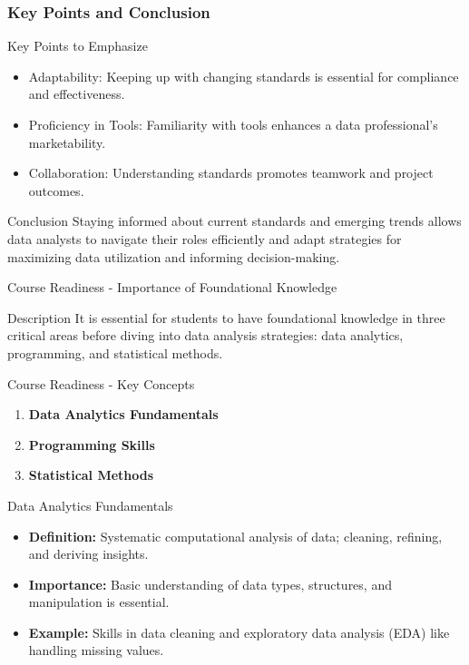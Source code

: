 \documentclass[aspectratio=169]{beamer}
\begin{document}
\begin{frame}[fragile]
    \frametitle{Key Points and Conclusion}
    \begin{block}{Key Points to Emphasize}
        \begin{itemize}
            \item Adaptability: Keeping up with changing standards is essential for compliance and effectiveness.
            \item Proficiency in Tools: Familiarity with tools enhances a data professional's marketability.
            \item Collaboration: Understanding standards promotes teamwork and project outcomes.
        \end{itemize}
    \end{block}

    \begin{block}{Conclusion}
        Staying informed about current standards and emerging trends allows data analysts to navigate their roles efficiently and adapt strategies for maximizing data utilization and informing decision-making.
    \end{block}
\end{frame}

\begin{frame}[fragile]{Course Readiness - Importance of Foundational Knowledge}
    \begin{block}{Description}
        It is essential for students to have foundational knowledge in three critical areas before diving into data analysis strategies: 
        data analytics, programming, and statistical methods.
    \end{block}
\end{frame}

\begin{frame}[fragile]{Course Readiness - Key Concepts}
    \begin{enumerate}
        \item \textbf{Data Analytics Fundamentals}
        \item \textbf{Programming Skills}
        \item \textbf{Statistical Methods}
    \end{enumerate}
\end{frame}

\begin{frame}[fragile]{Data Analytics Fundamentals}
    \begin{itemize}
        \item \textbf{Definition:} Systematic computational analysis of data; cleaning, refining, and deriving insights.
        \item \textbf{Importance:} Basic understanding of data types, structures, and manipulation is essential.
        \item \textbf{Example:} Skills in data cleaning and exploratory data analysis (EDA) like handling missing values.
    \end{itemize}
\end{frame}
\end{document}
